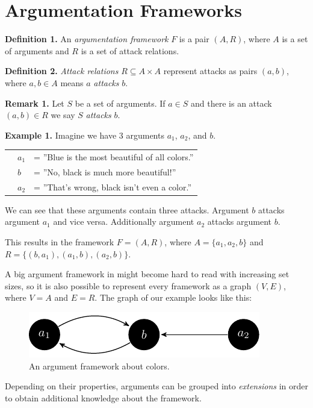 \documentclass[draft,final]{vutinfth} %
\newcommand{\hl}{\par\vspace{6pt}} %
\newcommand{\cl}{\par\vspace{12pt}} %
\begin{document}
\section{Argumentation Frameworks}

\textbf{Definition 1.} An \emph{argumentation framework} $F$ is a pair $(A,R)$, where $A$ is a set of arguments and $R$ is a set of attack relations.\cl

\textbf{Definition 2.} \emph{Attack relations} $R\subseteq A\times A$ represent attacks as pairs $(a,b)$, where $a,b\in A$ means $a$ \emph{attacks} $b$.\cl

\textbf{Remark 1.} Let $S$ be a set of arguments. If $a\in S$ and there is an attack $(a,b)\in R$ we say $S$ \emph{attacks} $b$.\cl

\textbf{Example 1.} Imagine we have 3 arguments $a_1$, $a_2$, and $b$.\hl
			\begin{tabular}{p{0.5cm}p{0.5cm}l}
			& $a_1$ & = ''Blue is the most beautiful of all colors.''\\
			& $b$ & = ''No, black is much more beautiful!''\\
			& $a_2$ & = ''That's wrong, black isn't even a color.''
			\end{tabular}\hl
We can see that these arguments contain three attacks. Argument $b$ attacks argument $a_1$ and vice versa. Additionally argument $a_2$ attacks argument $b$.\hl
This results in the framework $F=(A,R)$, where $A=\{a_1,a_2,b\}$ and $R=\{(b,a_1),(a_1,b),(a_2,b)\}$.\cl

A big argument framework in might become hard to read with increasing set sizes, so it is also possible to represent every framework as a graph $(V,E)$, where $V=A$ and $E=R$. The graph of our example looks like this:

\FloatBarrier
	\begin{figure}[!htb]
		\centering
		\includegraphics[width=\linewidth]{graphs/ex1_v2.pdf}
		\caption{An argument framework about colors.}
	\end{figure}
\FloatBarrier

Depending on their properties, arguments can be grouped into \emph{extensions} in order to obtain additional knowledge about the framework.\cl
\end{document}
